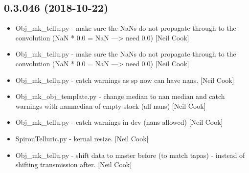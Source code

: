 \documentclass[a4paper,10pt,english]{report}
\begin{document}
\subsection{0.3.046 (2018-10-22)}
\label{\detokenize{misc/changelog:id284}}\begin{itemize}
\item {} 
Obj\_mk\_tellu.py - make sure the NaNs do not propagate through to the
convolution (NaN * 0.0 = NaN —\textgreater{} need 0.0) {[}Neil Cook{]}

\item {} 
Obj\_mk\_tellu.py - make sure the NaNs do not propagate through to the
convolution (NaN * 0.0 = NaN —\textgreater{} need 0.0) {[}Neil Cook{]}

\item {} 
Obj\_mk\_tellu.py - catch warnings as sp now can have nans. {[}Neil Cook{]}

\item {} 
Obj\_mk\_obj\_template.py - change median to nan median and catch
warnings with nanmedian of empty stack (all nans) {[}Neil Cook{]}

\item {} 
Obj\_mk\_tellu.py - catch warnings in dev (nans allowed) {[}Neil Cook{]}

\item {} 
SpirouTelluric.py - kernal resize. {[}Neil Cook{]}

\item {} 
Obj\_mk\_tellu.py - shift data to master before (to match tapas) -
instead of shifting transmission after. {[}Neil Cook{]}

\end{itemize}
\end{document}
